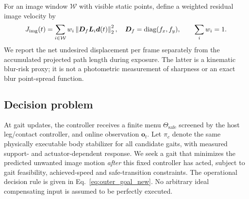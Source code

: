 For an image window $\mathcal W$ with visible static points, define a weighted residual image velocity by
\begin{equation}\label{eq:pixelcost}
J_{\mathrm{img}}(t)=\sum_{i\in\mathcal W}w_i\left\|\bm D_f\bm L_i \bm d(t)\right\|_2^2,\quad
\bm D_f=\mathrm{diag}(f_x,f_y),\qquad \sum_iw_i=1.
\end{equation}
We report the net undesired displacement per frame separately from the accumulated projected path length during exposure. The latter is a kinematic blur-risk proxy; it is not a photometric measurement of sharpness or an exact blur point-spread function.

\subsection{Decision problem}
At gait updates, the controller receives a finite menu $\Theta_{\mathrm{safe}}$ screened by the host leg/contact controller, and online observation $\bm o_t$. Let $\pi_c$ denote the same physically executable body stabilizer for all candidate gaits, with measured support- and actuator-dependent response. We seek a gait that minimizes the predicted unwanted image motion \emph{after} this fixed controller has acted, subject to gait feasibility, achieved-speed and safe-transition constraints. The operational decision rule is given in Eq.~\eqref{eq:outer_goal_new}. No arbitrary ideal compensating input is assumed to be perfectly executed.
